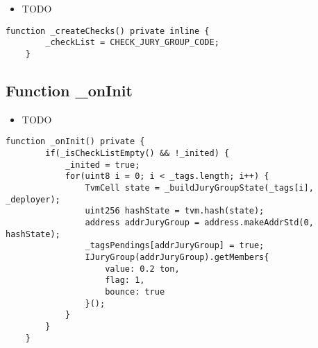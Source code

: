 \begin{itemize}
\item TODO
\end{itemize}

\begin{lstlisting}[firstnumber=17]
    function _createChecks() private inline {
        _checkList = CHECK_JURY_GROUP_CODE;
    }
\end{lstlisting}

\subsection{Function \_{}onInit}

\begin{itemize}
\item TODO
\end{itemize}

\begin{lstlisting}[firstnumber=47]
    function _onInit() private {
        if(_isCheckListEmpty() && !_inited) {
            _inited = true;
            for(uint8 i = 0; i < _tags.length; i++) {
                TvmCell state = _buildJuryGroupState(_tags[i], _deployer);
                uint256 hashState = tvm.hash(state);
                address addrJuryGroup = address.makeAddrStd(0, hashState);
                _tagsPendings[addrJuryGroup] = true;
                IJuryGroup(addrJuryGroup).getMembers{
                    value: 0.2 ton,
                    flag: 1,
                    bounce: true
                }();
            }
        }
    }
\end{lstlisting}
